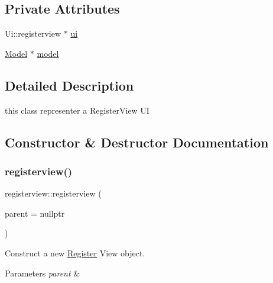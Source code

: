 \subsection*{Private Attributes}
\begin{DoxyCompactItemize}
\item 
Ui\+::registerview $\ast$ \hyperlink{classregisterview_ac8bc2dae39fb31c3bfe66f3c1ca07e59}{ui}
\item 
\hyperlink{classModel}{Model} $\ast$ \hyperlink{classregisterview_a1c8d39e08edad26afdfd16182189ee6c}{model}
\end{DoxyCompactItemize}


\subsection{Detailed Description}
this class representer a Register\+View UI 

\subsection{Constructor \& Destructor Documentation}
\mbox{\label{classregisterview_ad900dd927edcbdf6a134da28df5a83c6}} 
\subsubsection{\texorpdfstring{registerview()}{registerview()}}
{\footnotesize\ttfamily registerview\+::registerview (\begin{DoxyParamCaption}\item[{Q\+Widget $\ast$}]{parent = {\ttfamily nullptr} }\end{DoxyParamCaption})\hspace{0.3cm}{\ttfamily [explicit]}}



Construct a new \hyperlink{classRegister}{Register} View object. 


\begin{DoxyParams}{Parameters}
{\em parent} & \\
\hline
\end{DoxyParams}
\mbox{\label{classregisterview_a824fc1c7f2c9a8e62aad92be80d381c6}} 
